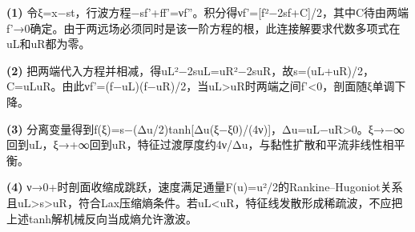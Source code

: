 \par\noindent\textbf{(1)} 令ξ=x−st，行波方程−sf'+ff'=νf''。积分得νf'=[f²−2sf+C]/2，其中C待由两端f'→0确定。由于两远场必须同时是该一阶方程的根，此连接解要求代数多项式在uL和uR都为零。
\par\noindent\textbf{(2)} 把两端代入方程并相减，得uL²−2suL=uR²−2suR，故s=(uL+uR)/2，C=uLuR。由此νf'=(f−uL)(f−uR)/2，当uL>uR时两端之间f'<0，剖面随ξ单调下降。
\par\noindent\textbf{(3)} 分离变量得到f(ξ)=s−(Δu/2)tanh[Δu(ξ−ξ0)/(4ν)]，Δu=uL−uR>0。ξ→−∞回到uL，ξ→+∞回到uR，特征过渡厚度约4ν/Δu，与黏性扩散和平流非线性相平衡。
\par\noindent\textbf{(4)} ν→0+时剖面收缩成跳跃，速度满足通量F(u)=u²/2的Rankine–Hugoniot关系且uL>s>uR，符合Lax压缩熵条件。若uL<uR，特征线发散形成稀疏波，不应把上述tanh解机械反向当成熵允许激波。
